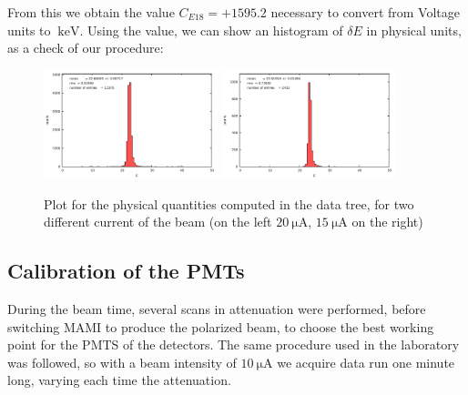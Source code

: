 From this we obtain the value $C_{E18} = +1595.2$ necessary to convert from Voltage units to $\SI{}{\kilo \electronvolt}$. Using the value, we can show an histogram of $\delta E$ in physical units, as a check of our procedure:

\begin{figure}[!h]
\centering
\includegraphics[width = 0.45\textwidth]{Analysis/ENMOCheck20.pdf}
\includegraphics[width = 0.45\textwidth]{Analysis/ENMOCheck15.pdf} 
\caption{Plot for the physical quantities computed in the data tree, for two different current of the beam (on the left $\SI{20}{\micro \ampere}$, $\SI{15}{\micro \ampere}$ on the right)}
\end{figure}
\newpage
\subsection{Calibration of the PMTs}

During the beam time, several scans in attenuation were performed, before switching MAMI to produce the polarized beam, to choose the best working point for the PMTS of the detectors. The same procedure used in the laboratory was followed, so with a beam intensity of $\SI{10}{\micro \ampere}$ we acquire data run one minute long, varying each time the attenuation.

